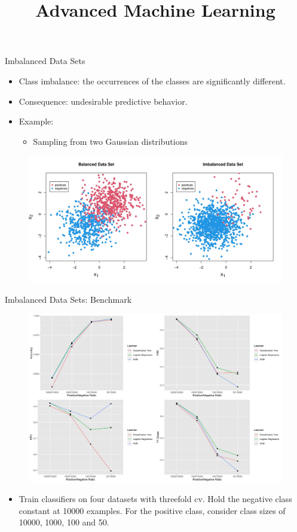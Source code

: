 \documentclass[11pt,compress,t,notes=noshow, xcolor=table]{beamer}
\title{Advanced Machine Learning}
\date{}
\begin{document}



\sloppy

\begin{vbframe}{Imbalanced Data Sets}
%		    
            \begin{itemize}
		        \item Class imbalance: the occurrences of the classes are significantly different. 		     
		        \item Consequence: undesirable predictive behavior.	    
		        \item 	Example:
		        \begin{itemize}
                \small    
		            \item Sampling from two Gaussian distributions 
		        \end{itemize}		    
		    \end{itemize}
		   
			\begin{figure}
				\centering
				\includegraphics[width=0.7\linewidth]{figure_man/combined_data_plots.jpg}
			\end{figure}
%
\end{vbframe}

\begin{vbframe}{Imbalanced Data Sets: Benchmark}
%
			\begin{figure}
				\centering
				\includegraphics[width=0.7\linewidth]{figure_man/benchmark_plots.png}
			\end{figure}
			
			\begin{itemize}
                \item Train classifiers on four datasets with threefold cv. Hold the negative class constant at 10000 examples. For the positive class, consider class         sizes of 10000, 1000, 100 and 50. 			
			\end{itemize}

%
\end{vbframe}
\end{document}
